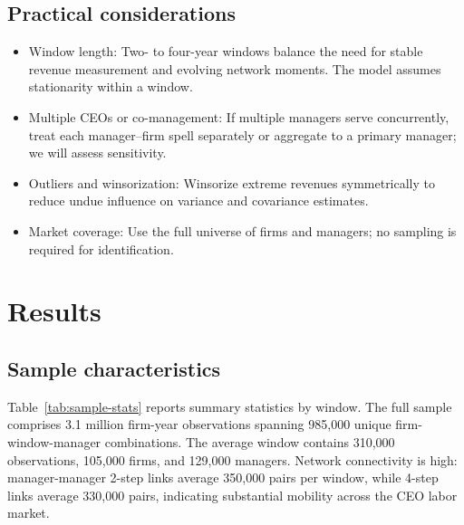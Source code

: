 \documentclass[11pt]{article}
\begin{document}
\subsection{Practical considerations}
\begin{itemize}
  \item Window length: Two- to four-year windows balance the need for stable revenue measurement and evolving network moments. The model assumes stationarity within a window.
  \item Multiple CEOs or co-management: If multiple managers serve concurrently, treat each manager--firm spell separately or aggregate to a primary manager; we will assess sensitivity.
  \item Outliers and winsorization: Winsorize extreme revenues symmetrically to reduce undue influence on variance and covariance estimates.
  \item Market coverage: Use the full universe of firms and managers; no sampling is required for identification.
\end{itemize}

\section{Results}
\label{sec:results}

\subsection{Sample characteristics}
Table~\ref{tab:sample-stats} reports summary statistics by window. The full sample comprises 3.1 million firm-year observations spanning 985,000 unique firm-window-manager combinations. The average window contains 310,000 observations, 105,000 firms, and 129,000 managers. Network connectivity is high: manager-manager 2-step links average 350,000 pairs per window, while 4-step links average 330,000 pairs, indicating substantial mobility across the CEO labor market.
\end{document}
